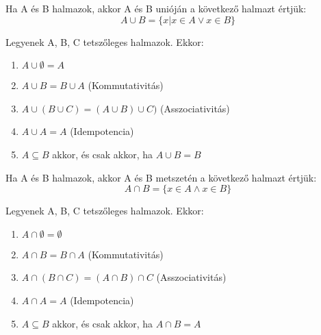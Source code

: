 \begin{frame}
  \begin{tcolorbox}[title={Definíció: Unió}]
    Ha A és B halmazok, akkor A és B unióján a következő halmazt értjük:\\
    $$A \cup B = \{x | x \in A \vee x \in B\}$$
  \end{tcolorbox}

  \begin{tcolorbox}[title={Tétel: Az unió tulajdonságai}]
    Legyenek A, B, C tetszőleges halmazok. Ekkor:

    \begin{enumerate}
      \item $A \cup \emptyset = A$
      \item $A \cup B = B \cup A$ (Kommutativitás)
      \item $A \cup (B \cup C) = (A \cup B) \cup C)$ (Asszociativitás)
      \item $A \cup A = A$ (Idempotencia)
      \item $A \subseteq B$ akkor, és csak akkor, ha $A \cup B = B$
    \end{enumerate}
  \end{tcolorbox}
\end{frame}

\begin{frame}
  \begin{tcolorbox}[title={Definíció: Metszet}]
    Ha A és B halmazok, akkor A és B metszetén a következő halmazt értjük:\\
    $$A \cap B = \{x \in A \wedge x \in B\}$$
  \end{tcolorbox}

  \begin{tcolorbox}[title={Tétel: A metszet tulajdonságai}]
    Legyenek A, B, C tetszőleges halmazok. Ekkor:

    \begin{enumerate}
      \item $A \cap \emptyset = \emptyset$
      \item $A \cap B = B \cap A$ (Kommutativitás)
      \item $A \cap (B \cap C) = (A \cap B) \cap C$ (Asszociativitás)
      \item $A \cap A = A$ (Idempotencia)
      \item $A \subseteq B$ akkor, és csak akkor, ha $A \cap B = A$
    \end{enumerate}
  \end{tcolorbox}
\end{frame}

